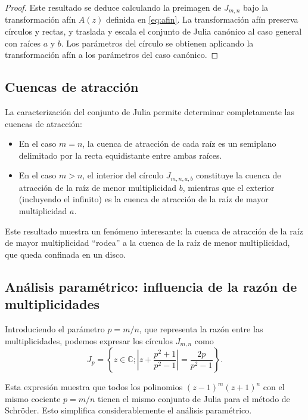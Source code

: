 \begin{proof}
Este resultado se deduce calculando la preimagen de $J_{m,n}$ bajo la transformación afín $A(z)$ definida en \eqref{eq:afin}. La transformación afín preserva círculos y rectas, y traslada y escala el conjunto de Julia canónico al caso general con raíces $a$ y $b$. Los parámetros del círculo se obtienen aplicando la transformación afín a los parámetros del caso canónico.
\end{proof}

\subsection{Cuencas de atracción}

La caracterización del conjunto de Julia permite determinar completamente las cuencas de atracción:

\begin{itemize}
\item En el caso $m=n$, la cuenca de atracción de cada raíz es un semiplano delimitado por la recta equidistante entre ambas raíces.

\item En el caso $m>n$, el interior del círculo $J_{m,n,a,b}$ constituye la cuenca de atracción de la raíz de menor multiplicidad $b$, mientras que el exterior (incluyendo el infinito) es la cuenca de atracción de la raíz de mayor multiplicidad $a$.
\end{itemize}

Este resultado muestra un fenómeno interesante: la cuenca de atracción de la raíz de mayor multiplicidad ``rodea'' a la cuenca de la raíz de menor multiplicidad, que queda confinada en un disco.

\subsection{Análisis paramétrico: influencia de la razón de multiplicidades}

Introduciendo el parámetro $p=m/n$, que representa la razón entre las multiplicidades, podemos expresar los círculos $J_{m,n}$ como
\begin{equation}
J_{p}=\left\{z\in\mathbb{C}; \left|z+\frac{p^2+1}{p^2-1}\right|=\frac{2p}{p^2-1}\right\}.
\label{eq:Julia_param}
\end{equation}

Esta expresión muestra que todos los polinomios $(z-1)^m(z+1)^n$ con el mismo cociente $p=m/n$ tienen el mismo conjunto de Julia para el método de Schröder. Esto simplifica considerablemente el análisis paramétrico.

